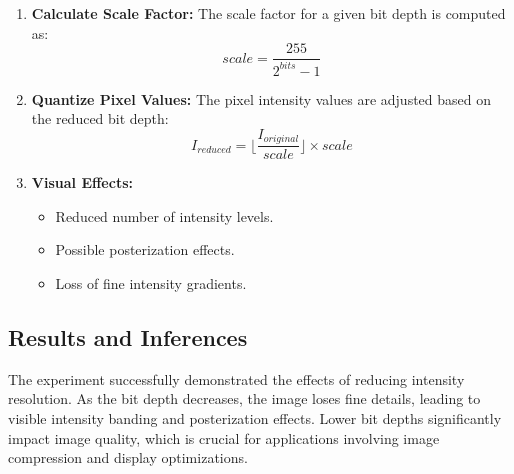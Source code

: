 \documentclass[12pt,a4paper]{article}
\begin{document}
\begin{enumerate}
  \item \textbf{Calculate Scale Factor:}
    The scale factor for a given bit depth is computed as:
    \[
      scale = \frac{255}{2^{bits} - 1}
    \]

  \item \textbf{Quantize Pixel Values:}
    The pixel intensity values are adjusted based on the reduced bit depth:
    \[
      I_{reduced} = \lfloor \frac{I_{original}}{scale} \rfloor \times scale
    \]

  \item \textbf{Visual Effects:}
    \begin{itemize}
      \item Reduced number of intensity levels.
      \item Possible posterization effects.
      \item Loss of fine intensity gradients.
    \end{itemize}
\end{enumerate}

\subsection{Results and Inferences}
The experiment successfully demonstrated the effects of reducing intensity resolution. As the bit depth decreases, the image loses fine details, leading to visible intensity banding and posterization effects. Lower bit depths significantly impact image quality, which is crucial for applications involving image compression and display optimizations.
\end{document}
